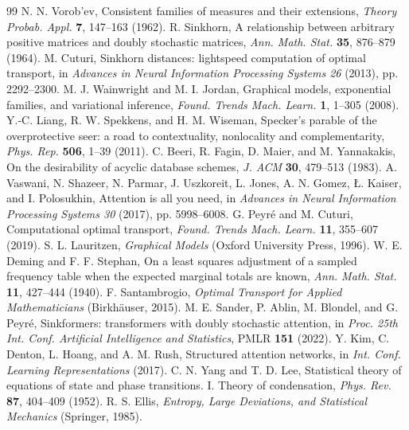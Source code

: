 \documentclass[11pt]{article}
\theoremstyle{boldplain}
\theoremstyle{boldupright}
\begin{document}
\begin{thebibliography}{99}
 N. N. Vorob'ev, Consistent families of measures and their extensions, \emph{Theory Probab. Appl.} \textbf{7}, 147--163 (1962).
 R. Sinkhorn, A relationship between arbitrary positive matrices and doubly stochastic matrices, \emph{Ann. Math. Stat.} \textbf{35}, 876--879 (1964).
 M. Cuturi, Sinkhorn distances: lightspeed computation of optimal transport, in \emph{Advances in Neural Information Processing Systems 26} (2013), pp. 2292--2300.
 M. J. Wainwright and M. I. Jordan, Graphical models, exponential families, and variational inference, \emph{Found. Trends Mach. Learn.} \textbf{1}, 1--305 (2008).
 Y.-C. Liang, R. W. Spekkens, and H. M. Wiseman, Specker's parable of the overprotective seer: a road to contextuality, nonlocality and complementarity, \emph{Phys. Rep.} \textbf{506}, 1--39 (2011).
 C. Beeri, R. Fagin, D. Maier, and M. Yannakakis, On the desirability of acyclic database schemes, \emph{J. ACM} \textbf{30}, 479--513 (1983).
 A. Vaswani, N. Shazeer, N. Parmar, J. Uszkoreit, L. Jones, A. N. Gomez, {\L}. Kaiser, and I. Polosukhin, Attention is all you need, in \emph{Advances in Neural Information Processing Systems 30} (2017), pp. 5998--6008.
 G. Peyr\'e and M. Cuturi, Computational optimal transport, \emph{Found. Trends Mach. Learn.} \textbf{11}, 355--607 (2019).
 S. L. Lauritzen, \emph{Graphical Models} (Oxford University Press, 1996).
 W. E. Deming and F. F. Stephan, On a least squares adjustment of a sampled frequency table when the expected marginal totals are known, \emph{Ann. Math. Stat.} \textbf{11}, 427--444 (1940).
 F. Santambrogio, \emph{Optimal Transport for Applied Mathematicians} (Birkh\"auser, 2015).
 M. E. Sander, P. Ablin, M. Blondel, and G. Peyr\'e, Sinkformers: transformers with doubly stochastic attention, in \emph{Proc. 25th Int. Conf. Artificial Intelligence and Statistics}, PMLR \textbf{151} (2022).
 Y. Kim, C. Denton, L. Hoang, and A. M. Rush, Structured attention networks, in \emph{Int. Conf. Learning Representations} (2017).
 C. N. Yang and T. D. Lee, Statistical theory of equations of state and phase transitions. I. Theory of condensation, \emph{Phys. Rev.} \textbf{87}, 404--409 (1952).
 R. S. Ellis, \emph{Entropy, Large Deviations, and Statistical Mechanics} (Springer, 1985).
\end{thebibliography}
\end{document}
